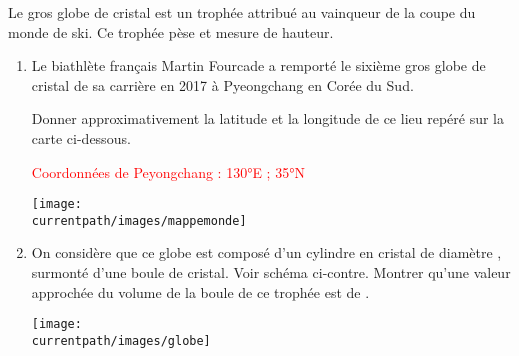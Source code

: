 \begin{corrige}
        Le gros globe de cristal est un trophée attribué au vainqueur de la coupe du monde de ski.
    Ce trophée pèse  et mesure  de hauteur.

    \begin{enumerate}
        \item Le biathlète français Martin Fourcade a remporté le sixième gros globe de cristal de
        sa carrière en 2017 à Pyeongchang en Corée du Sud.

        Donner approximativement la latitude et la longitude de ce lieu repéré sur la carte ci-dessous.

        \textcolor{red}{Coordonnées de Peyongchang : \ang{130}E ; \ang{35}N}

        \texttt{[image: \\currentpath/images/mappemonde]}            

        \item On considère que ce globe est composé d'un cylindre en cristal de diamètre , surmonté d'une boule de cristal.
        Voir schéma ci-contre. Montrer qu'une valeur approchée du volume de la boule de ce trophée est de .

        \begin{minipage}{0.4\linewidth}
            \vspace*{-5mm}
            \texttt{[image: \\currentpath/images/globe]}
        \end{minipage}            
        \begin{minipage}{0.4\linewidth}
        \end{minipage}


\end{enumerate}
\end{corrige}
